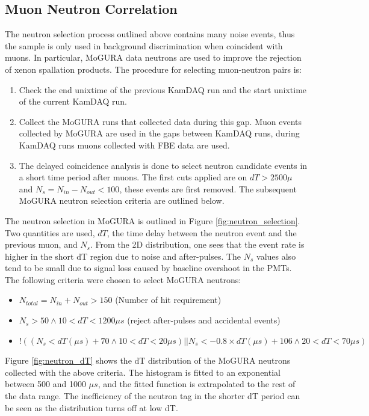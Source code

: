 \subsection{Muon Neutron Correlation}
The neutron selection process outlined above contains many noise events, thus the sample is only used in background discrimination when coincident with muons. In particular, MoGURA data neutrons are used to improve the rejection of xenon spallation products. The procedure for selecting muon-neutron pairs is:
\begin{enumerate}
	\item Check the end unixtime of the previous KamDAQ run and the start unixtime of the current KamDAQ run.
	\item Collect the MoGURA runs that collected data during this gap. Muon events collected by MoGURA are used in the gaps between KamDAQ runs, during KamDAQ runs muons collected with FBE data are used.
	\item The delayed coincidence analysis is done to select neutron candidate events in a short time period after muons. The first cuts applied are on $dT>2500\mu $ and $N_{s}=N_{in}-N_{out}<100$, these events are first removed. The subsequent MoGURA neutron selection criteria are outlined below.  
\end{enumerate}

The neutron selection in MoGURA is outlined in Figure \ref{fig:neutron_selection}. Two quantities are used, $dT$, the time delay between the neutron event and the previous muon, and $N_s$. From the 2D distribution, one sees that the event rate is higher in the short dT region due to noise and after-pulses. The $N_s$ values also tend to be small due to signal loss caused by baseline overshoot in the PMTs. The following criteria were chosen to select MoGURA neutrons:
\begin{itemize}
	\item $N_{total}=N_{in}+N_{out}>150$ (Number of hit requirement)
	\item $N_s>50 \wedge 10<dT<1200\mu s $ (reject after-pulses and accidental events)
	\item $!((N_s<dT(\mu s)+70\wedge 10<dT<20 \mu s )||N_s<-0.8\times dT(\mu s)+106\wedge20<dT<70\mu s)$
\end{itemize}
Figure \ref{fig:neutron_dT} shows the dT distribution of the MoGURA neutrons collected with the above criteria. The histogram is fitted to an exponential between 500 and 1000 $\mu s$, and the fitted function is extrapolated to the rest of the data range. The inefficiency of the neutron tag in the shorter dT period can be seen as the distribution turns off at low dT.

